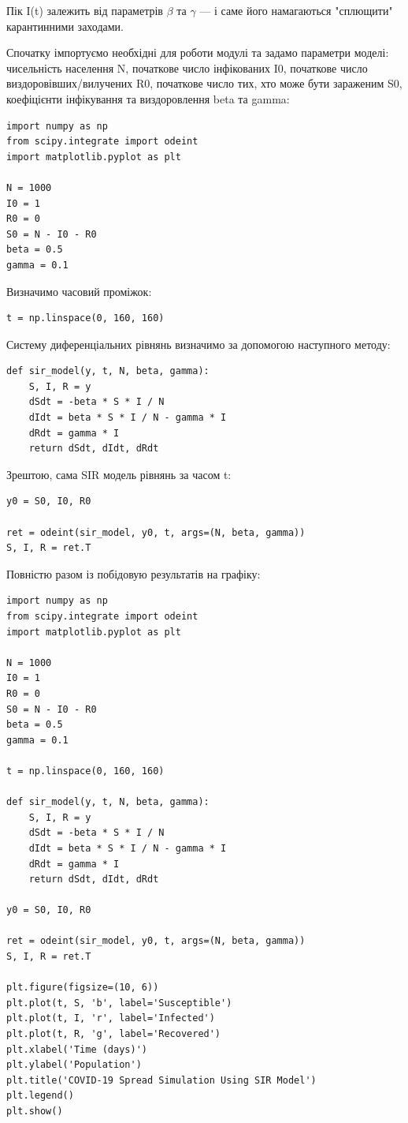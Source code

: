 Пік I(t) залежить від параметрів $\beta$ та $\gamma$ — і саме його намагаються "сплющити" карантинними заходами.

Спочатку імпортуємо необхідні для роботи модулі та задамо параметри моделі: чисельність населення N, початкове число інфікованих I0, початкове число виздоровівших/вилучених R0, початкове число тих, хто може бути зараженим S0, коефіцієнти інфікування та виздоровлення beta та gamma:

\begin{lstlisting}
import numpy as np
from scipy.integrate import odeint
import matplotlib.pyplot as plt

N = 1000         
I0 = 1         
R0 = 0           
S0 = N - I0 - R0 
beta = 0.5    
gamma = 0.1    
\end{lstlisting}

Визначимо часовий проміжок:

\begin{lstlisting}
t = np.linspace(0, 160, 160)
\end{lstlisting}

Систему диференціальних рівнянь визначимо за допомогою наступного методу: 

\begin{lstlisting}
def sir_model(y, t, N, beta, gamma):
    S, I, R = y
    dSdt = -beta * S * I / N
    dIdt = beta * S * I / N - gamma * I
    dRdt = gamma * I
    return dSdt, dIdt, dRdt
\end{lstlisting}

Зрештою, сама SIR модель рівнянь за часом t:

\begin{lstlisting}
y0 = S0, I0, R0

ret = odeint(sir_model, y0, t, args=(N, beta, gamma))
S, I, R = ret.T
\end{lstlisting}

Повністю разом із побідовую результатів на графіку:


\begin{lstlisting}
import numpy as np
from scipy.integrate import odeint
import matplotlib.pyplot as plt

N = 1000         
I0 = 1         
R0 = 0           
S0 = N - I0 - R0 
beta = 0.5    
gamma = 0.1    

t = np.linspace(0, 160, 160)

def sir_model(y, t, N, beta, gamma):
    S, I, R = y
    dSdt = -beta * S * I / N
    dIdt = beta * S * I / N - gamma * I
    dRdt = gamma * I
    return dSdt, dIdt, dRdt

y0 = S0, I0, R0

ret = odeint(sir_model, y0, t, args=(N, beta, gamma))
S, I, R = ret.T

plt.figure(figsize=(10, 6))
plt.plot(t, S, 'b', label='Susceptible')
plt.plot(t, I, 'r', label='Infected')
plt.plot(t, R, 'g', label='Recovered')
plt.xlabel('Time (days)')
plt.ylabel('Population')
plt.title('COVID-19 Spread Simulation Using SIR Model')
plt.legend()
plt.show()
\end{lstlisting}

